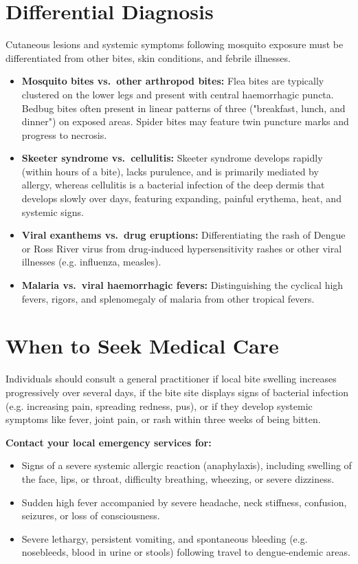 \section*{Differential Diagnosis}
Cutaneous lesions and systemic symptoms following mosquito exposure must be differentiated from other bites, skin conditions, and febrile illnesses.
\begin{itemize}
    \item \textbf{Mosquito bites vs.\ other arthropod bites:} Flea bites are typically clustered on the lower legs and present with central haemorrhagic puncta. Bedbug bites often present in linear patterns of three ("breakfast, lunch, and dinner") on exposed areas. Spider bites may feature twin puncture marks and progress to necrosis.
    \item \textbf{Skeeter syndrome vs.\ cellulitis:} Skeeter syndrome develops rapidly (within hours of a bite), lacks purulence, and is primarily mediated by allergy, whereas cellulitis is a bacterial infection of the deep dermis that develops slowly over days, featuring expanding, painful erythema, heat, and systemic signs.
    \item \textbf{Viral exanthems vs.\ drug eruptions:} Differentiating the rash of Dengue or Ross River virus from drug-induced hypersensitivity rashes or other viral illnesses (e.g. influenza, measles).
    \item \textbf{Malaria vs.\ viral haemorrhagic fevers:} Distinguishing the cyclical high fevers, rigors, and splenomegaly of malaria from other tropical fevers.
\end{itemize}

\section*{When to Seek Medical Care}
Individuals should consult a general practitioner if local bite swelling increases progressively over several days, if the bite site displays signs of bacterial infection (e.g. increasing pain, spreading redness, pus), or if they develop systemic symptoms like fever, joint pain, or rash within three weeks of being bitten.

\textbf{Contact your local emergency services for:}
\begin{itemize}
    \item Signs of a severe systemic allergic reaction (anaphylaxis), including swelling of the face, lips, or throat, difficulty breathing, wheezing, or severe dizziness.
    \item Sudden high fever accompanied by severe headache, neck stiffness, confusion, seizures, or loss of consciousness.
    \item Severe lethargy, persistent vomiting, and spontaneous bleeding (e.g. nosebleeds, blood in urine or stools) following travel to dengue-endemic areas.
\end{itemize}

